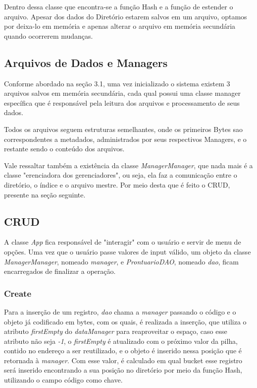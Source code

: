 Dentro dessa classe que encontra-se a função Hash e a função de estender o arquivo. Apesar dos dados do Diretório estarem salvos em um arquivo, optamos por deixa-lo em memória e apenas alterar o arquivo em memória secundária quando ocorrerem mudanças.

\subsection{\esp Arquivos de Dados e Managers}

Conforme abordado na seção 3.1, uma vez inicializado o sistema existem 3 arquivos salvos em memória secundária, cada qual possui uma classe manager específica que é responsável pela leitura dos arquivos e processamento de seus dados.

Todos os arquivos seguem estruturas semelhantes, onde os primeiros Bytes sao correspondentes a metadados, administrados por seus respectivos Managers, e o restante sendo o conteúdo dos arquivos.

Vale ressaltar também a existência da classe \textit{ManagerManager}, que nada mais é a classe "erenciadora dos gerenciadores", ou seja, ela faz a comunicação entre o diretório, o índice e o arquivo mestre. Por meio desta que é feito o CRUD, presente na seção seguinte.

\subsection{\esp CRUD}
A classe \textit{App} fica responsável de "interagir" com o usuário e servir de menu de opções. Uma vez que o usuário passe valores de input válido, um objeto da classe \textit{ManagerManager}, nomeado \textit{manager}, e \textit{ProntuarioDAO}, nomeado \textit{dao}, ficam encarregados de finalizar a operação.

\subsubsection{\esp Create}
Para a inserção de um registro, \textit{dao} chama a \textit{manager} passando o código e o objeto já codificado em bytes, com os quais, é realizada a inserção, que utiliza o atributo \textit{firstEmpty} do \textit{dataManager} para reaproveitar o espaço, caso esse atributo não seja \textit{-1}, o \textit{firstEmpty} é atualizado com o próximo valor da pilha, contido no endereço a ser reutilizado, e o objeto é inserido nessa posição que é retornada à \textit{manager}. Com esse valor, é calculado em qual bucket esse registro será inserido encontrando a sua posição no diretório por meio da função Hash, utilizando o campo código como chave. 

